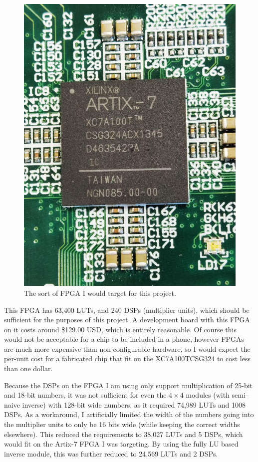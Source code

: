 \documentclass[12pt]{article}
\begin{document}
\begin{figure}[thp]
	\centering
	
	\includegraphics[width=\textwidth]{tim_xilinx.jpg}
	
	\caption{The sort of FPGA I would target for this project.}
	\label{tim_xilinx}
\end{figure}

This FPGA has 63,400 LUTs, and 240 DSPs (multiplier units), which should be sufficient for the purposes of this project. A development board with this FPGA on it costs around \$129.00 USD, which is entirely reasonable. Of course this would not be acceptable for a chip to be included in a phone, however FPGAs are much more expensive than non-configurable hardware, so I would expect the per-unit cost for a fabricated chip that fit on the XC7A100TCSG324 to cost less than one dollar.

Because the DSPs on the FPGA I am using only support multiplication of 25-bit and 18-bit numbers, it was not sufficient for even the $4\times4$ modules (with semi--naive inverse) with 128-bit wide numbers, as it required 74,989 LUTs and 1008 DSPs. As a workaround, I artificially limited the width of the numbers going into the multiplier units to only be 16 bits wide (while keeping the correct widths elsewhere). This reduced the requirements to 38,027 LUTs and 5 DSPs, which would fit on the Artix-7 FPGA I was targeting. By using the fully LU based inverse module, this was further reduced to 24,569 LUTs and 2 DSPs.
\end{document}
